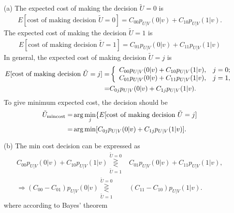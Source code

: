 \documentclass{assignment}
\begin{document}
\begin{sol}
    \begin{itemize}
        \item[(a)] The expected cost of making the decision $\tilde{U}=0$ is
        \begin{align}
            E[\text{cost of making decision }\tilde{U}=0]=C_{00}p_{U\vert V}(0\vert v)+C_{10}p_{U\vert V}(1\vert v).
        \end{align}
        The expected cost of making the decision $\tilde{U}=1$ is
        \begin{align}
            E[\text{cost of making decision }\tilde{U}=1]=C_{01}p_{U\vert V}(0\vert v)+C_{11}p_{U\vert V}(1\vert v)
        \end{align}
        In general, the expected cost of making decision $\tilde{U}=j$ is
        \begin{align}
            \notag E[\text{cost of making decision }\tilde{U}=j]=&\left\{\begin{array}{ll}
                C_{00}p_{U\vert V}(0\vert v)+C_{10}p_{U\vert V}(1\vert v),&j=0;\\
                C_{01}p_{U\vert V}(0\vert v)+C_{11}p_{U\vert V}(1\vert v),&j=1,
            \end{array}\right.\\
            =&C_{0j}p_{U\vert V}(0\vert v)+C_{1j}p_{U\vert V}(1\vert v).
        \end{align}
        To give minimum expected cost, the decision should be
        \begin{align}
            \notag\tilde{U}_{\text{mincost}}=&\arg\min_j\{E[\text{cost of making decision }\tilde{U}=j]\\
            =&\arg\min[C_{0j}p_{U\vert V}(0\vert v)+C_{1j}p_{U\vert V}(1\vert v)].
        \end{align}
        \item[(b)] The min cost decision can be expressed as
        \begin{align}
            C_{00}p_{U\vert V}(0\vert v)+C_{10}p_{U\vert V}(1\vert v)\overset{\tilde{U}=0}{\underset{\tilde{U}=1}{\gtreqless}}&C_{01}p_{U\vert V}(0\vert v)+C_{11}p_{U\vert V}(1\vert v),\\
            \Longrightarrow(C_{00}-C_{01})p_{U\vert V}(0\vert v)\overset{\tilde{U}=0}{\underset{\tilde{U}=1}{\gtreqless}}&(C_{11}-C_{10})p_{U\vert V}(1\vert v).
        \end{align}
        where according to Bayes' theorem
        \begin{align}

\end{align}
\end{itemize}
\end{sol}
\end{document}
